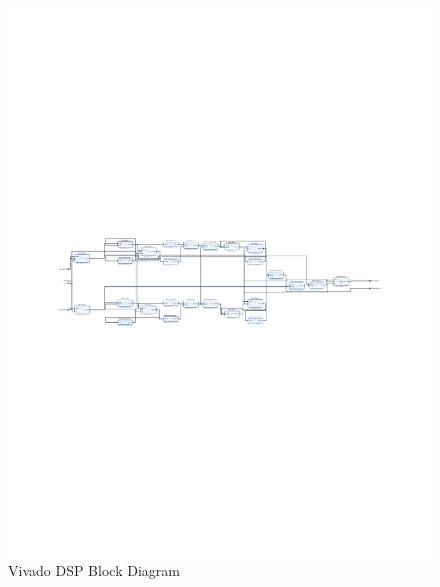\begin{landscape}\centering
\vspace*{\fill}
\begin{figure}[h]
\centerline{\includegraphics[width=1\linewidth]{4-ANC_Sys/VivadoBD_DSP_onFPGA.pdf}}
\caption{Vivado DSP Block Diagram}
\label{fig_VivadoBD_DSP_onFPGA}
\end{figure}
\vfill
\end{landscape}

